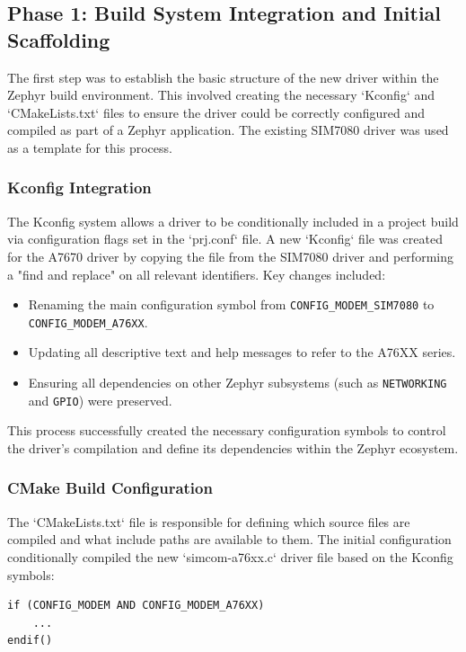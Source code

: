 \subsection{Phase 1: Build System Integration and Initial Scaffolding}
The first step was to establish the basic structure of the new driver within the Zephyr build environment. This involved creating the necessary `Kconfig` and `CMakeLists.txt` files to ensure the driver could be correctly configured and compiled as part of a Zephyr application. The existing SIM7080 driver was used as a template for this process.

\subsubsection{Kconfig Integration}
The Kconfig system allows a driver to be conditionally included in a project build via configuration flags set in the `prj.conf` file. A new `Kconfig` file was created for the A7670 driver by copying the file from the SIM7080 driver and performing a "find and replace" on all relevant identifiers. Key changes included:

\begin{itemize}
    \item Renaming the main configuration symbol from \texttt{CONFIG\_MODEM\_SIM7080} to \texttt{CONFIG\_MODEM\_A76XX}.
    \item Updating all descriptive text and help messages to refer to the A76XX series.
    \item Ensuring all dependencies on other Zephyr subsystems (such as \texttt{NETWORKING} and \texttt{GPIO}) were preserved.
\end{itemize}

This process successfully created the necessary configuration symbols to control the driver's compilation and define its dependencies within the Zephyr ecosystem.

\subsubsection{CMake Build Configuration}
The `CMakeLists.txt` file is responsible for defining which source files are compiled and what include paths are available to them. The initial configuration conditionally compiled the new `simcom-a76xx.c` driver file based on the Kconfig symbols:

\begin{verbatim}
if (CONFIG_MODEM AND CONFIG_MODEM_A76XX)
    ...
endif()
\end{verbatim}


